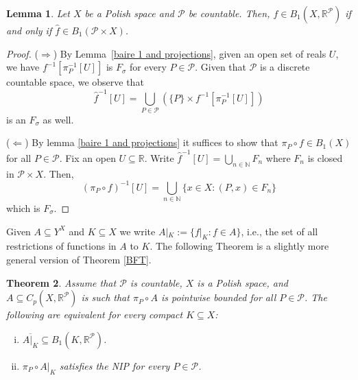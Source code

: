 \documentclass[psamsfonts]{amsart}
\newtheorem{thm}{Theorem}[section]
\newtheorem{lem}[thm]{Lemma}
\theoremstyle{definition}
\theoremstyle{remark}
\numberwithin{equation}{section}
\begin{document}
\begin{lem}\label{homeo}
    Let $X$ be a Polish space and $\mathcal{P}$ be countable.
Then, $f\in B_1(X,\mathbb{R}^\mathcal{P})$ if and only if $\hat f\in B_1(\mathcal{P}\times X)$.
\end{lem}

\begin{proof}
    ($\Rightarrow$) By Lemma~\ref{baire 1 and projections}, given an open set of reals $U$, we have  $f^{-1}[\pi_P^{-1}[U]]$ is $F_\sigma$ for every $P\in\mathcal{P}$.
Given that $\mathcal{P}$ is a discrete countable space, we observe that
    $$\hat f^{-1}[U]=\bigcup_{P\in\mathcal{P}}\left(\{P\}\times f^{-1}[\pi_P^{-1}[U]]\right)
    $$ is an $F_\sigma$ as well.
    
    ($\Leftarrow$) By lemma \ref{baire 1 and projections} it suffices to show that $\pi_P\circ f\in B_1(X)$ for all $P\in\mathcal{P}$.
Fix an open $U\subseteq\mathbb{R}$.
Write $\hat{f}^{-1}[U]=\bigcup_{n\in\mathbb{N}}F_n$ where $F_n$ is closed in $\mathcal{P}\times X$.
Then,
    $$(\pi_P\circ f)^{-1}[U]=\bigcup_{n\in\mathbb{N}}\{x\in X:(P,x)\in F_n\}$$
    which is $F_\sigma$.
\end{proof}

Given $A\subseteq Y^X$ and $K\subseteq X$ we write $A|_K:=\{f|_K:f\in A\}$, i.e., the set of all restrictions of functions in $A$ to $K$.
The following Theorem is a slightly more general version of Theorem \ref{BFT}.

\begin{thm}\label{Generalized BFT}
    Assume that $\mathcal{P}$ is countable, $X$ is a Polish space, and $A\subseteq C_p(X,\mathbb{R}^\mathcal{P})$ is such that $\pi_P\circ A$ is pointwise bounded for all $P\in\mathcal{P}$.
The following are equivalent for every compact $K\subseteq X$:

    \begin{enumerate}[(i)]
        \item $\overline{A|_K}\subseteq B_1(K,\mathbb{R}^\mathcal{P})$.
        \item $\pi_P\circ A|_K$ satisfies the NIP for every $P\in\mathcal{P}$.
    \end{enumerate}
\end{thm}
\end{document}
